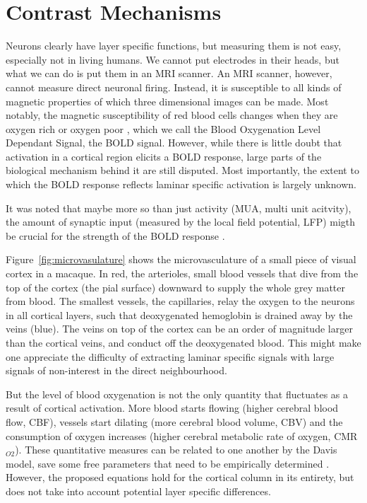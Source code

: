 \section*{Contrast Mechanisms}
Neurons clearly have layer specific functions, but measuring them is not easy, especially not in living humans. We cannot put electrodes in their heads, but what we can do is put them in an MRI scanner. An MRI scanner, however, cannot measure direct neuronal firing. Instead, it is susceptible to all kinds of magnetic properties of which three dimensional images can be made. Most notably, the magnetic susceptibility of red blood cells changes when they are oxygen rich or oxygen poor \cite{Ogawa1990}, which we call the Blood Oxygenation Level Dependant Signal, the BOLD signal. However, while there is little doubt that activation in a cortical region elicits a BOLD response, large parts of the biological mechanism behind it are still disputed. Most importantly, the extent to which the BOLD response reflects laminar specific activation is largely unknown. 

It was noted that maybe more so than just activity (MUA, multi unit acitvity), the amount of synaptic input (measured by the local field potential, LFP) migth be crucial for the strength of the BOLD response \cite{Goense2008}.


Figure~\ref{fig:microvasulature} shows the microvasculature of a small piece of visual cortex in a macaque. In red, the arterioles, small blood vessels that dive from the top of the cortex (the pial surface) downward to supply the whole grey matter from blood. The smallest vessels, the capillaries, relay the oxygen to the neurons in all cortical layers, such that deoxygenated hemoglobin is drained away by the veins (blue). The veins on top of the cortex can be an order of magnitude larger than the cortical veins, and conduct off the deoxygenated blood. This might make one appreciate the difficulty of extracting laminar specific signals with large signals of non-interest in the direct neighbourhood. 

But the level of blood oxygenation is not the only quantity that fluctuates as a result of cortical activation. More blood starts flowing (higher cerebral blood flow, CBF), vessels start dilating (more cerebral blood volume, CBV) and the consumption of oxygen increases (higher cerebral metabolic rate of oxygen, CMR$_{O2}$). These quantitative measures can be related to one another by the Davis model, save some free parameters that need to be empirically determined \cite{Davis1997}. However, the proposed equations hold for the cortical column in its entirety, but does not take into account potential layer specific differences. 


